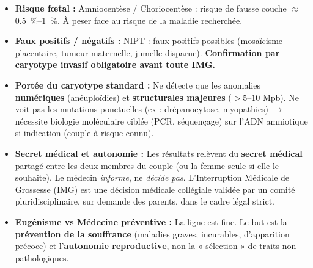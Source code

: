 \documentclass[11pt]{article}
\newcounter{popsec}
\newcounter{popsub}
\newcommand{\courssub}[1]{%
  \stepcounter{popsub}%
  \par\vspace{9pt}\noindent{\popxbold\fontsize{11.5}{13}\selectfont\color{popink}{\color{poporange}\thepopsec.\thepopsub}\hspace{6pt}#1}\par\nopagebreak\vspace{4pt}
}
\begin{document}
\begin{exoresolu}
\begin{enumerate}
\begin{itemize}
\begin{itemize}
        \end{itemize}
    \end{itemize}
\end{enumerate}
\end{exoresolu}

\courssub{Limites, éthique et bilan}

\begin{attention}
\begin{itemize}
    \item \textbf{Risque fœtal :} Amniocentèse / Choriocentèse : risque de fausse couche $\approx$ \SI{0,5}{\%}--\SI{1}{\%}. À peser face au risque de la maladie recherchée.
    \item \textbf{Faux positifs / négatifs :} NIPT : faux positifs possibles (mosaïcisme placentaire, tumeur maternelle, jumelle disparue). \textbf{Confirmation par caryotype invasif obligatoire avant toute IMG.}
    \item \textbf{Portée du caryotype standard :} Ne détecte que les anomalies \textbf{numériques} (anéuploïdies) et \textbf{structurales majeures} ($> 5$--$10$ Mpb). Ne voit pas les mutations ponctuelles (ex : drépanocytose, myopathies) $\rightarrow$ nécessite biologie moléculaire ciblée (PCR, séquençage) sur l'ADN amniotique si indication (couple à risque connu).
    \item \textbf{Secret médical et autonomie :} Les résultats relèvent du \textbf{secret médical} partagé entre les deux membres du couple (ou la femme seule si elle le souhaite). Le médecin \emph{informe}, ne \emph{décide pas}. L'Interruption Médicale de Grossesse (IMG) est une décision médicale collégiale validée par un comité pluridisciplinaire, sur demande des parents, dans le cadre légal strict.
    \item \textbf{Eugénisme vs Médecine préventive :} La ligne est fine. Le but est la \textbf{prévention de la souffrance} (maladies graves, incurables, d'apparition précoce) et l'\textbf{autonomie reproductive}, non la « sélection » de traits non pathologiques.
\end{itemize}
\end{attention}
\end{document}
